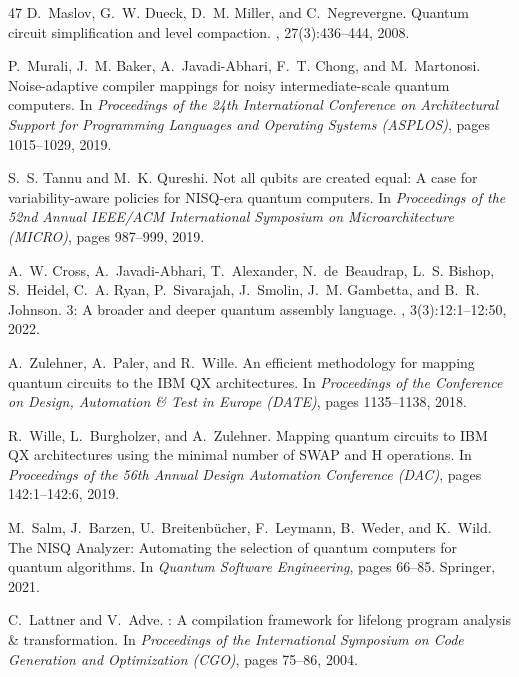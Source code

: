 \documentclass[sigconf,nonacm]{acmart}
\begin{document}
\begin{thebibliography}{47}
D.~Maslov, G.~W. Dueck, D.~M. Miller, and C.~Negrevergne.
\newblock Quantum circuit simplification and level compaction.
, 27(3):436--444, 2008.

P.~Murali, J.~M. Baker, A.~Javadi-Abhari, F.~T. Chong, and M.~Martonosi.
\newblock Noise-adaptive compiler mappings for noisy intermediate-scale quantum computers.
\newblock In {\em Proceedings of the 24th International Conference on Architectural Support for Programming Languages and Operating Systems (ASPLOS)}, pages 1015--1029, 2019.

S.~S. Tannu and M.~K. Qureshi.
\newblock Not all qubits are created equal: A case for variability-aware policies for {NISQ}-era quantum computers.
\newblock In {\em Proceedings of the 52nd Annual IEEE/ACM International Symposium on Microarchitecture (MICRO)}, pages 987--999, 2019.

A.~W. Cross, A.~Javadi-Abhari, T.~Alexander, N.~de~Beaudrap, L.~S. Bishop, S.~Heidel, C.~A. Ryan, P.~Sivarajah, J.~Smolin, J.~M. Gambetta, and B.~R. Johnson.
 3: A broader and deeper quantum assembly language.
, 3(3):12:1--12:50, 2022.

A.~Zulehner, A.~Paler, and R.~Wille.
\newblock An efficient methodology for mapping quantum circuits to the {IBM QX} architectures.
\newblock In {\em Proceedings of the Conference on Design, Automation \& Test in Europe (DATE)}, pages 1135--1138, 2018.

R.~Wille, L.~Burgholzer, and A.~Zulehner.
\newblock Mapping quantum circuits to {IBM QX} architectures using the minimal number of {SWAP} and {H} operations.
\newblock In {\em Proceedings of the 56th Annual Design Automation Conference (DAC)}, pages 142:1--142:6, 2019.

M.~Salm, J.~Barzen, U.~Breitenb{\"u}cher, F.~Leymann, B.~Weder, and K.~Wild.
\newblock The {NISQ} {A}nalyzer: Automating the selection of quantum computers for quantum algorithms.
\newblock In {\em Quantum Software Engineering}, pages 66--85. Springer, 2021.

C.~Lattner and V.~Adve.
: A compilation framework for lifelong program analysis \& transformation.
\newblock In {\em Proceedings of the International Symposium on Code Generation and Optimization (CGO)}, pages 75--86, 2004.


\end{thebibliography}
\end{document}
